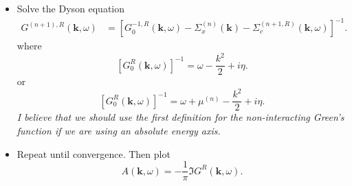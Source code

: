 \begin{itemize}
\begin{align}
    &\qquad\times
    \left[
    \frac{
        f^{(n)}(\epsilon)
    }{
        \omega-\epsilon+\Omega+i\eta
    }
    +
    \frac{
        1-f^{(n)}(\epsilon)
    }{
        \omega-\epsilon-\Omega+i\eta
    }
    \right].
\end{align}
\item[8.] Solve the Dyson equation
\begin{align}
    G^{(n+1),R}(\mathbf{k}, \omega)&=\left[G_0^{-1, R}(\mathbf{k}, \omega)-\Sigma_x^{(n)}(\mathbf{k})-\Sigma_c^{(n+1,R)}(\mathbf{k}, \omega)\right]^{-1}.
\end{align}
where
\begin{equation}
\left[G_0^R(\mathbf{k}, \omega)\right]^{-1}=\omega-\frac{k^2}{2}+i \eta .
\end{equation}
or
\begin{equation}
\left[G_0^R(\mathbf{k}, \omega)\right]^{-1}=\omega+\mu^{(n)}-\frac{k^2}{2}+i \eta .
\end{equation}
\emph{I believe that we should use the first definition for the non-interacting Green's function if we are using an absolute energy axis. }
\item[9.] Repeat until convergence. Then plot
\begin{equation}
    A(\mathbf{k}, \omega)=-\frac{1}{\pi} \Im G^{R}(\mathbf{k}, \omega) .
\end{equation}
\end{itemize}

